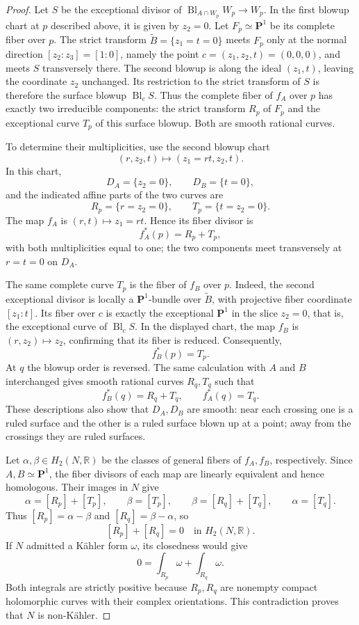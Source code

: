 \documentclass[11pt]{amsart}
\theoremstyle{definition}
\theoremstyle{remark}
\numberwithin{equation}{section}
\newcommand{\R}{\mathbb R}
\newcommand{\PP}{\mathbf P}
\newcommand{\Bl}{\operatorname{Bl}}
\begin{document}
\begin{proof}
Let $S$ be the exceptional divisor of
$\Bl_{A\cap W_p}W_p\to W_p$. In the first blowup chart at $p$
described above, it is given by $z_2=0$. Let $F_p\simeq\PP^1$
be its complete fiber over $p$. The strict transform
$\widetilde B=\{z_1=t=0\}$ meets $F_p$ only at the normal
direction $[z_2:z_3]=[1:0]$, namely the point
$c=(z_1,z_2,t)=(0,0,0)$, and meets $S$ transversely there.
The second blowup is along the ideal $(z_1,t)$, leaving the
coordinate $z_2$ unchanged. Its restriction to the strict
transform of $S$ is therefore the surface blowup $\Bl_c S$.
Thus the complete fiber of $f_A$ over $p$ has exactly two
irreducible components: the strict transform $R_p$ of $F_p$ and
the exceptional curve $T_p$ of this surface blowup. Both are
smooth rational curves.

To determine their multiplicities, use the second blowup chart
\[
 (r,z_2,t)\longmapsto(z_1=rt,z_2,t).
\]
In this chart,
\[
 D_A=\{z_2=0\},\qquad D_B=\{t=0\},
\]
and the indicated affine parts of the two curves are
\[
 R_p=\{r=z_2=0\},\qquad T_p=\{t=z_2=0\}.
\]
The map $f_A$ is $(r,t)\mapsto z_1=rt$. Hence its fiber divisor is
\[
 f_A^*(p)=R_p+T_p,
\]
with both multiplicities equal to one; the two components meet
transversely at $r=t=0$ on $D_A$.

The same complete curve $T_p$ is the fiber of $f_B$ over $p$.
Indeed, the second exceptional divisor is locally a
$\PP^1$-bundle over $\widetilde B$, with projective fiber
coordinate $[z_1:t]$. Its fiber over $c$ is exactly the
exceptional $\PP^1$ in the slice $z_2=0$, that is, the exceptional
curve of $\Bl_c S$. In the displayed chart, the map $f_B$ is
$(r,z_2)\mapsto z_2$, confirming that its fiber is reduced.
Consequently,
\[
 f_B^*(p)=T_p.
\]
At $q$ the blowup order is reversed. The same calculation with
$A$ and $B$ interchanged gives smooth rational curves $R_q,T_q$
such that
\[
 f_B^*(q)=R_q+T_q,\qquad f_A^*(q)=T_q.
\]
These descriptions also show that $D_A,D_B$ are smooth: near
each crossing one is a ruled surface and the other is a ruled
surface blown up at a point; away from the crossings they are
ruled surfaces.

Let $\alpha,\beta\in H_2(N,\R)$ be the classes of general fibers
of $f_A,f_B$, respectively. Since $A,B\simeq\PP^1$, the fiber
divisors of each map are linearly equivalent and hence homologous.
Their images in $N$ give
\[
 \alpha=[R_p]+[T_p],\qquad \beta=[T_p],\qquad
 \beta=[R_q]+[T_q],\qquad \alpha=[T_q].
\]
Thus $[R_p]=\alpha-\beta$ and $[R_q]=\beta-\alpha$, so
\begin{equation}\label{eq:hironaka-zero-cycle}
 [R_p]+[R_q]=0\quad\text{in }H_2(N,\R).
\end{equation}
If $N$ admitted a K\"ahler form $\omega$, its closedness would give
\[
 0=\int_{R_p}\omega+\int_{R_q}\omega.
\]
Both integrals are strictly positive because $R_p,R_q$ are
nonempty compact holomorphic curves with their complex
orientations. This contradiction proves that $N$ is non-K\"ahler.
\end{proof}
\end{document}
